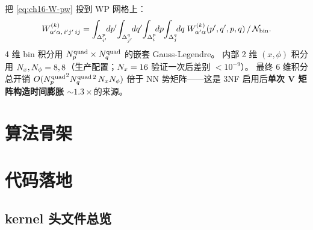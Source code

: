 把 \cref{eq:ch16-W-pw} 投到 WP 网格上：
\begin{equation}
\label{eq:ch16-W-WP}
\Wsymbol^{(k)}_{\PWchanp\PWchan,\, i'j'\, ij}
= \int_{\binp{i'}}\!\!dp'\!\int_{\binq{j'}}\!\!dq'\!\int_{\binp{i}}\!\!dp\!\int_{\binq{j}}\!\!dq\;
  \Wsymbol^{(k)}_{\PWchanp\PWchan}(\jacobip',\jacobiq',\jacobip,\jacobiq)\,/\,\Niso_{\rm bin}.
\end{equation}
4 维 bin 积分用 \({N_{p}^{\text{quad}}} \times N_q^{\rm quad}\) 的嵌套 Gauss-Legendre。
内部 2 维 \((x, \phi)\) 积分用 \(N_x, N_{\phi} = 8, 8\)（生产配置；\(N_x=16\) 验证一次后差别 \(<10^{-9}\)）。
最终 6 维积分总开销 \(O({N_{p}^{\text{quad}}}^2 N_q^{\rm quad\,2}\,N_xN_{\phi})\) 倍于 NN 势矩阵——这是 3NF 启用后\textbf{单次 V 矩阵构造时间膨胀 \(\sim 1.3\times\)}的来源。

\section{算法骨架}
\label{sec:ch16-algorithm}

\begin{algorithm}[H]
\caption{N$^2$LO 3NF 部分波 kernel 组装}
\label{alg:ch16-3nf-pw}
\end{algorithm}

\section{代码落地}
\label{sec:ch16-code-land}

\subsection{kernel 头文件总览}

